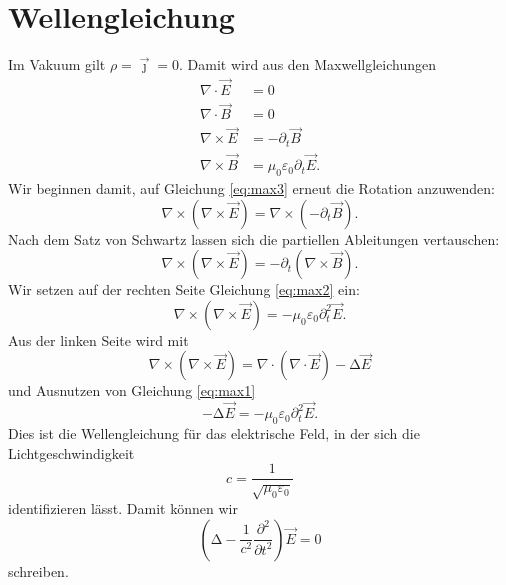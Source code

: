 \documentclass{scrartcl}
\begin{document}
\section{Wellengleichung}
Im Vakuum gilt $\rho = \vec{\jmath} = 0$.
Damit wird aus den Maxwellgleichungen
\begin{align}
  \nabla \cdot  \vec{E} &= 0 \label{eq:max1} \\
  \nabla \cdot  \vec{B} &= 0 \label{eq:max2} \\
  \nabla \times \vec{E} &= - \partial_t \vec{B} \label{eq:max3} \\
  \nabla \times \vec{B} &= \mu_0 \varepsilon_0 \partial_t \vec{E} . \label{eq:max4}
\end{align}
Wir beginnen damit, auf Gleichung \eqref{eq:max3} erneut die Rotation anzuwenden:
\begin{equation}
  \nabla \times \left( \nabla \times \vec{E} \right) = \nabla \times \left( - \partial_t \vec{B} \right) .
\end{equation}
Nach dem Satz von Schwartz lassen sich die partiellen Ableitungen vertauschen:
\begin{equation}
  \nabla \times \left( \nabla \times \vec{E} \right) = - \partial_t \left( \nabla \times \vec{B} \right) .
\end{equation}
Wir setzen auf der rechten Seite Gleichung \eqref{eq:max2} ein:
\begin{equation}
  \nabla \times \left( \nabla \times \vec{E} \right) = - \mu_0 \varepsilon_0 \partial_t^2 \vec{E} .
\end{equation}
Aus der linken Seite wird mit
\begin{equation}
  \nabla \times \left( \nabla \times \vec{E} \right) = \nabla \cdot \left( \nabla \cdot \vec{E} \right) - \increment \vec{E}
\end{equation}
und Ausnutzen von Gleichung \eqref{eq:max1}
\begin{equation}
  - \increment\vec{E} = -\mu_0 \varepsilon_0 \partial_t^2 \vec{E} .
\end{equation}
Dies ist die Wellengleichung für das elektrische Feld, in der sich die Lichtgeschwindigkeit
\begin{equation}
  c = \frac{1}{\sqrt{\mu_0 \varepsilon_0}}
\end{equation}
identifizieren lässt.
Damit können wir
\begin{equation}
  \left(\increment - \frac{1}{c^2} \frac{\partial^2}{\partial t^2} \right) \vec{E} = 0
\end{equation}
schreiben.
\end{document}
